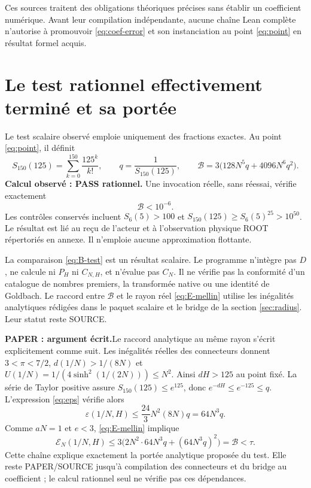 \documentclass[11pt,a4paper]{article}
\theoremstyle{remark}
\newcommand{\paper}{\textbf{PAPER : argument écrit.}\space}
\begin{document}
Ces sources traitent des obligations théoriques précises sans établir un
coefficient numérique. Avant leur compilation indépendante, aucune chaîne
Lean complète n'autorise à promouvoir \eqref{eq:coef-error} et son
instanciation au point \eqref{eq:point} en résultat formel acquis.

\clearpage
\section{Le test rationnel effectivement terminé et sa portée}\label{sec:scalar-test}
Le test scalaire observé emploie uniquement des fractions exactes. Au point
\eqref{eq:point}, il définit
\[
S_{150}(125)=\sum_{k=0}^{150}\frac{125^k}{k!},\qquad
q=\frac1{S_{150}(125)},\qquad
\mathcal B=3\bigl(128N^5q+4096N^6q^2\bigr).
\]
\textbf{Calcul observé : PASS rationnel.} Une invocation réelle, sans
réessai, vérifie exactement
\begin{equation}\label{eq:B-test}
\mathcal B<10^{-6}.
\end{equation}
Les contrôles conservés incluent
$S_6(5)>100$ et
$S_{150}(125)\ge S_6(5)^{25}>10^{50}$.
Le résultat est lié au reçu de l'acteur et à l'observation physique ROOT
répertoriés en annexe. Il n'emploie aucune approximation flottante.

La comparaison \eqref{eq:B-test} est un résultat scalaire. Le programme
n'intègre pas $D$, ne calcule ni $P_H$ ni $C_{N,H}$, et n'évalue pas
$C_N$. Il ne vérifie pas la conformité d'un catalogue de nombres premiers,
la transformée native ou une identité de Goldbach. Le raccord entre
$\mathcal B$ et le rayon réel \eqref{eq:E-mellin} utilise les inégalités
analytiques rédigées dans le paquet scalaire et le bridge de la section
\ref{sec:radius}. Leur statut reste SOURCE.

\paper Le raccord analytique au même rayon s'écrit explicitement comme
suit. Les inégalités réelles des connecteurs donnent $3<\pi<7/2$,
$d(1/N)>1/(8N)$ et
$U(1/N)=1/(4\sinh^2(1/(2N)))\le N^2$.
Ainsi $dH>125$ au point fixé. La série de Taylor positive assure
$S_{150}(125)\le e^{125}$, donc
$e^{-dH}\le e^{-125}\le q$. L'expression \eqref{eq:eps} vérifie alors
\[
\varepsilon(1/N,H)\le
\frac{24}{3}N^2(8N)q=64N^3q.
\]
Comme $aN=1$ et $e<3$, \eqref{eq:E-mellin} implique
\[
\mathcal E_N(1/N,H)\le
3\bigl(2N^2\cdot64N^3q+(64N^3q)^2\bigr)=\mathcal B<\tau.
\]
Cette chaîne explique exactement la portée analytique proposée du test.
Elle reste PAPER/SOURCE jusqu'à compilation des connecteurs et du bridge
au coefficient ; le calcul rationnel seul ne vérifie pas ces dépendances.
\end{document}
